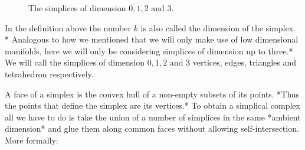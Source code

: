 \begin{figure}[h]

    \caption{The simplices of dimension $0, 1, 2$ and $3$.}%
    \label{fig:example}%
\end{figure}

In the definition above the number $k$ is also called the dimension of the simplex. * Analogous to how we mentioned that we will only make use of low dimensional manifolds, here we will only be considering simplices of dimension up to three.*  We will call the simplices of dimension $0, 1, 2 \text{ and } 3$ vertices, edges, triangles and tetrahedron respectively.

A face of a simplex is the convex hull of a non-empty subsets of its points. *Thus the points that define the simplex are its vertices.* To obtain a simplical complex all we have to do is take the union of a number of simplices in the same *ambient dimension* and glue them along common faces without allowing self-intersection. More formally:

